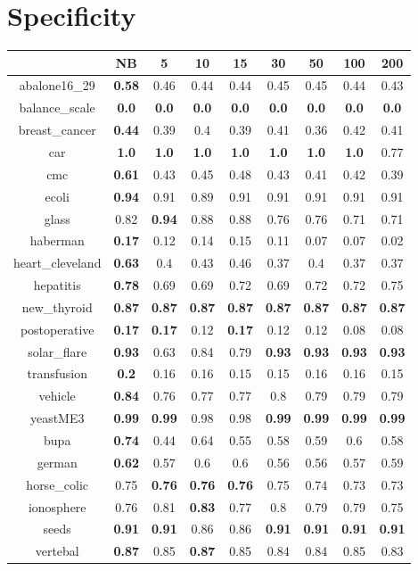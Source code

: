 \documentclass{article}%
\begin{document}
%
\section*{Specificity}%
\begin{tabular}{c|cccccccc}%
\hline%
&NB&5&10&15&30&50&100&200\\%
\hline%
abalone16\_29&\textbf{0.58}&0.46&0.44&0.44&0.45&0.45&0.44&0.43\\%
\hline%
balance\_scale&\textbf{0.0}&\textbf{0.0}&\textbf{0.0}&\textbf{0.0}&\textbf{0.0}&\textbf{0.0}&\textbf{0.0}&\textbf{0.0}\\%
\hline%
breast\_cancer&\textbf{0.44}&0.39&0.4&0.39&0.41&0.36&0.42&0.41\\%
\hline%
car&\textbf{1.0}&\textbf{1.0}&\textbf{1.0}&\textbf{1.0}&\textbf{1.0}&\textbf{1.0}&\textbf{1.0}&0.77\\%
\hline%
cmc&\textbf{0.61}&0.43&0.45&0.48&0.43&0.41&0.42&0.39\\%
\hline%
ecoli&\textbf{0.94}&0.91&0.89&0.91&0.91&0.91&0.91&0.91\\%
\hline%
glass&0.82&\textbf{0.94}&0.88&0.88&0.76&0.76&0.71&0.71\\%
\hline%
haberman&\textbf{0.17}&0.12&0.14&0.15&0.11&0.07&0.07&0.02\\%
\hline%
heart\_cleveland&\textbf{0.63}&0.4&0.43&0.46&0.37&0.4&0.37&0.37\\%
\hline%
hepatitis&\textbf{0.78}&0.69&0.69&0.72&0.69&0.72&0.72&0.75\\%
\hline%
new\_thyroid&\textbf{0.87}&\textbf{0.87}&\textbf{0.87}&\textbf{0.87}&\textbf{0.87}&\textbf{0.87}&\textbf{0.87}&\textbf{0.87}\\%
\hline%
postoperative&\textbf{0.17}&\textbf{0.17}&0.12&\textbf{0.17}&0.12&0.12&0.08&0.08\\%
\hline%
solar\_flare&\textbf{0.93}&0.63&0.84&0.79&\textbf{0.93}&\textbf{0.93}&\textbf{0.93}&\textbf{0.93}\\%
\hline%
transfusion&\textbf{0.2}&0.16&0.16&0.15&0.15&0.16&0.16&0.15\\%
\hline%
vehicle&\textbf{0.84}&0.76&0.77&0.77&0.8&0.79&0.79&0.79\\%
\hline%
yeastME3&\textbf{0.99}&\textbf{0.99}&0.98&0.98&\textbf{0.99}&\textbf{0.99}&\textbf{0.99}&\textbf{0.99}\\%
\hline%
bupa&\textbf{0.74}&0.44&0.64&0.55&0.58&0.59&0.6&0.58\\%
\hline%
german&\textbf{0.62}&0.57&0.6&0.6&0.56&0.56&0.57&0.59\\%
\hline%
horse\_colic&0.75&\textbf{0.76}&\textbf{0.76}&\textbf{0.76}&0.75&0.74&0.73&0.73\\%
\hline%
ionosphere&0.76&0.81&\textbf{0.83}&0.77&0.8&0.79&0.79&0.75\\%
\hline%
seeds&\textbf{0.91}&\textbf{0.91}&0.86&0.86&\textbf{0.91}&\textbf{0.91}&\textbf{0.91}&\textbf{0.91}\\%
\hline%
vertebal&\textbf{0.87}&0.85&\textbf{0.87}&0.85&0.84&0.84&0.85&0.83\\%
\hline%
\end{tabular}
\end{document}
